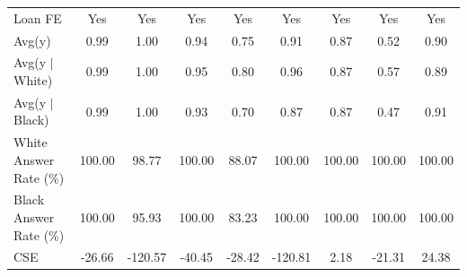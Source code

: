 {\begin{tabular}{l*{8}{c}}
Loan FE         &      Yes         &      Yes         &      Yes         &      Yes         &      Yes         &      Yes         &      Yes         &      Yes         \\
Avg(y)          &     0.99         &     1.00         &     0.94         &     0.75         &     0.91         &     0.87         &     0.52         &     0.90         \\
Avg(y $|$ White)&     0.99         &     1.00         &     0.95         &     0.80         &     0.96         &     0.87         &     0.57         &     0.89         \\
Avg(y $|$ Black)&     0.99         &     1.00         &     0.93         &     0.70         &     0.87         &     0.87         &     0.47         &     0.91         \\
White Answer Rate (\%)&   100.00         &    98.77         &   100.00         &    88.07         &   100.00         &   100.00         &   100.00         &   100.00         \\
Black Answer Rate (\%)&   100.00         &    95.93         &   100.00         &    83.23         &   100.00         &   100.00         &   100.00         &   100.00         \\
CSE             &   -26.66         &  -120.57         &   -40.45         &   -28.42         &  -120.81         &     2.18         &   -21.31         &    24.38         \\
\bottomrule
\end{tabular}
}
